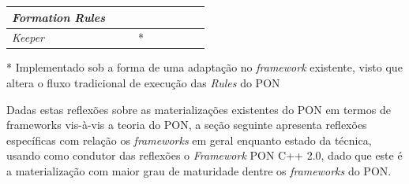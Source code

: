 \begin{table}[!htb]
\begin{threeparttable}
\begin{tabularx}{\textwidth}{|l||*{8}{X|}}
    \textit{Formation Rules}      &             &                &             &
                                  &             &                &             &                       \\\hline
    \textit{Keeper}               &             &                & *           &
                                  &             &                &             &                       \\\hline
  \end{tabularx}
  \begin{tablenotes}
    \item[*] Implementado sob a forma de uma adaptação no \textit{framework}
    existente, visto que altera o fluxo tradicional de execução das
    \textit{Rules} do PON \cite{muchalski_2012}
  \end{tablenotes}
\end{threeparttable}
\label{tab:conceitos}
\end{table}

Dadas estas reflexões sobre as materializações existentes do PON em termos de
frameworks vis-à-vis a teoria do PON, a seção seguinte apresenta reflexões
específicas com relação os \textit{frameworks} em geral enquanto estado da
técnica, usando como condutor das reflexões o \textit{Framework} PON C++ 2.0,
dado que este é a materialização com maior grau de maturidade dentre os
\textit{frameworks} do PON.

